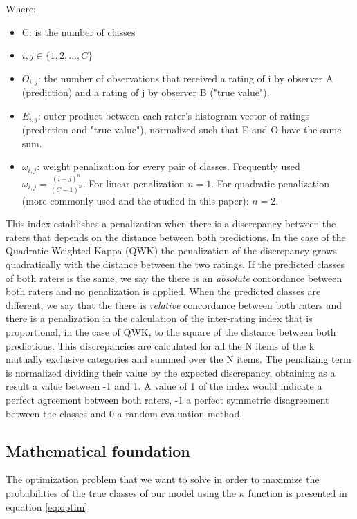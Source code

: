 \documentclass[times,twocolumn,final,authoryear]{elsarticle}
\begin{document}
Where:
\begin{itemize}
	\item[] C: is the number of classes
    \item[] $i, j \in \{ 1, 2, ..., C\}$
	\item[] $O_{i,j}$: the number of observations that received a rating of i by observer A (prediction) and a rating of j by observer B ("true value").
	\item[] $E_{i,j}$: outer product between each rater's histogram vector of ratings (prediction and "true value"), normalized such that E and O have the same sum.
	\item[] $\omega_{i,j}$: weight penalization for every pair of classes. Frequently used $\omega_{i,j} = \frac{(i-j)^n}{(C - 1)^n}$. For linear penalization $n = 1$. For quadratic penalization (more commonly used and the studied in this paper): $n = 2$.
\end{itemize}

This index establishes a penalization when there is a discrepancy between the raters that depends on the distance between both predictions. In the case of the Quadratic Weighted Kappa (QWK) the penalization of the discrepancy grows quadratically with the distance between the two ratings. If the predicted classes of both raters is the same, we say the there is an \emph{absolute} concordance between both raters and no penalization is applied. When the predicted classes are different, we say that the there is \emph{relative} concordance between both raters and there is a penalization in the calculation of the inter-rating index that is proportional, in the case of QWK, to the square of the distance between both predictions. This discrepancies are calculated for all the N items of the k mutually exclusive categories and summed over the N items. The penalizing term is normalized dividing their value by the expected  discrepancy, obtaining as a result a value between -1 and 1. A value of 1 of the index would indicate a perfect agreement between both raters, -1 a perfect symmetric disagreement between the classes and 0 a random evaluation method. 

\subsection{Mathematical foundation}

The optimization problem that we want to solve in order to maximize the probabilities of the true classes of our model using the $\kappa$ function is presented in equation \ref{eq:optim}
\end{document}
